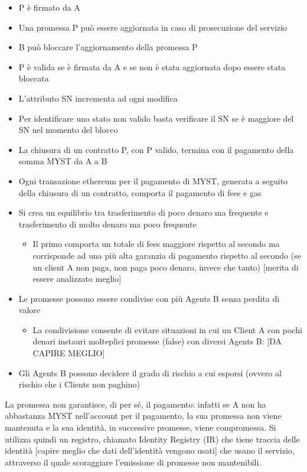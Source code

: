 \documentclass[]{article}
\begin{document}
	\begin{itemize}
	\item P è firmato da A
	\item Una promessa P può essere aggiornata in caso di prosecuzione del servizio
	\item B può bloccare l’aggiornamento della promessa P
	\item P è valida se è firmata da A e se non è stata aggiornata dopo essere stata bloccata
	\item L’attributo SN incrementa ad ogni modifica
	\item Per identificare uno stato non valido basta verificare il SN se è maggiore del SN nel momento del blocco
	\item La chiusura di un contratto P, con P valido, termina con il pagamento della somma MYST da A a B
	\item Ogni transazione ethereum per il pagamento di MYST, generata a seguito della chiusura di un contratto, comporta il pagamento di fees e gas
	\item Si crea un equilibrio tra trasferimento di poco denaro ma frequente e trasferimento di molto denaro ma poco frequente
	\begin{itemize}
	\item Il primo comporta un totale di fees maggiore rispetto al secondo ma corrisponde ad una più alta garanzia di pagamento rispetto al secondo (se un client A non paga, non paga poco denaro, invece che tanto) [merita di essere analizzato meglio]
	\end{itemize}
	\item Le promesse possono essere condivise con più Agents B senza perdita di valore
	\begin{itemize}
	\item La condivisione consente di evitare situazioni in cui un Client A con pochi denari instauri molteplici promesse (false) con diversi Agents B: [DA CAPIRE MEGLIO]
	\end{itemize}
	\item Gli Agents B possono decidere il grado di rischio a cui esporsi (ovvero al rischio che i Clients non paghino)
	\end{itemize}	

	La promessa non garantisce, di per sé, il pagamento: infatti se A non ha abbastanza MYST nell'account per il pagamento, la sua promessa non viene mantenuta e la sua identità, in successive promesse, viene compromessa.
	Si utilizza quindi un registro, chiamato Identity Registry (IR) che tiene traccia delle identità [capire meglio che dati dell’identità vengono usati] che usano il servizio, attraverso il quale scoraggiare l’emissione di promesse non mantenibili.
	
\end{document}
